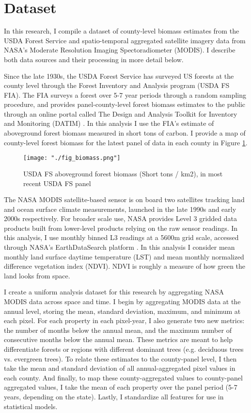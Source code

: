 \documentclass{article}
\begin{document}
\section{Dataset}
\label{sec:data}

In this research, I compile a dataset of county-level biomass estimates from the USDA Forest Service and spatio-temporal aggregated satellite imagery data from NASA's Moderate Resolution Imaging Spectoradiometer (MODIS). I describe both data sources and their processing in more detail below. 

Since the late 1930s, the USDA Forest Service has surveyed US forests at the county level through the Forest Inventory and Analysis program (USDA FS FIA). The FIA surveys a forest over 5-7 year periods through a random sampling procedure, and provides panel-county-level forest biomass estimates to the public through an online portal called The Design and Analysis Toolkit for Inventory and Monitoring (DATIM) \cite{DATIM}. In this analysis I use the FIA's estimate of aboveground forest biomass measured in short tons of carbon. I provide a map of county-level forest biomass for the latest panel of data in each county in Figure \ref{fig:biomass}.

\begin{figure}[!htbp]
  \centering
  \texttt{[image: "./fig\_biomass.png"]}
  \caption{\label{fig:biomass} USDA FS aboveground forest biomass (Short tons / km2), in most recent USDA FS panel}
\end{figure}

The NASA MODIS satellite-based sensor is on board two satellites tracking land and ocean surface climate measurements, launched in the late 1990s and early 2000s respectively. For broader scale use, NASA provides Level 3 gridded data products built from lower-level products relying on the raw sensor readings. In this analysis, I use monthly binned L3 readings at a 5600m grid scale, accessed through NASA's EarthDataSearch platform \cite{modis_ndvi} \cite{modis_lst}. In this analysis I consider mean monthly land surface daytime temperature (LST) and mean monthly normalized difference vegetation index (NDVI). NDVI is roughly a measure of how green the land looks from space.

I create a uniform analysis dataset for this research by aggregating NASA MODIS data across space and time. I begin by aggregating MODIS data at the annual level, storing the mean, standard deviation, maximum, and minimum at each pixel. For each property in each pixel-year, I also generate two new metrics: the number of months below the annual mean, and the maximum number of consecutive months below the annual mean. These metrics are meant to help differentiate forests or regions with different dominant trees (e.g. deciduous trees vs. evergreen trees). To relate these estimates to the county-panel level, I then take the mean and standard deviation of all annual-aggregated pixel values in each county. And finally, to map these county-aggregated values to county-panel aggregated values, I take the mean of each property over the panel period (5-7 years, depending on the state). Lastly, I standardize all features for use in statistical models.
\end{document}
